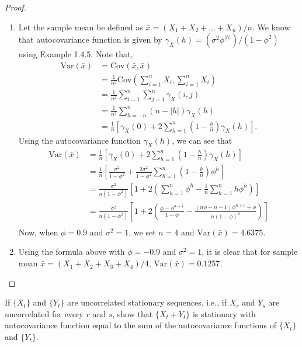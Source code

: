 \documentclass[12pt]{article}
\theoremstyle{definition}
\newenvironment{custompbm}[1]
  {\renewcommand\theproblem{#1}\problem}
  {\endproblem}
\newcommand{\V}{\text{Var}}
\newcommand{\Co}[2]{\text{Cov}({#1}, {#2})}
\begin{document}
\begin{proof}
  \begin{enumerate}
    \item Let the sample mean be defined as $\bar{x} = (X_1 + X_2 + \dots + X_n) / n$.
      We know that autocovariance function is given by
      $\gamma_X(h) = (\sigma^2\phi ^ {|h|} ) / (1 - \phi^2)$ using Example 1.4.5.
      Note that,
      \begin{align*}
        \V(\bar{x}) &= \Co{\bar{x}}{\bar{x}} \\
        &= \frac{1}{n^2}\text{Cov}\left(\sum_{i=1}^n X_i, \sum_{i=1}^n X_i\right) \\
        &= \frac{1}{n^2}\sum_{i=1}^{n} \sum_{j=1}^n \gamma_X(i,j) \\
        &= \frac{1}{n^2}\sum_{h=-n}^{n} (n - |h|)\gamma_X(h)\\
        &= \frac{1}{n}\left[\gamma_X(0) + 2\sum_{h=1}^{n}\left(1-\frac{h}{n}\right)\gamma_X(h)\right].
      \end{align*}
      Using the autocovariance function $\gamma_X(h)$, we can see that
      \begin{align*}
        \V(\bar{x}) &= \frac{1}{n}\left[\gamma_X(0) + 2\sum_{h=1}^{n}\left(1-\frac{h}{n}\right)\gamma_X(h)\right] \\
        &= \frac{1}{n}\left[\frac{\sigma^2}{1-\phi^2} + \frac{2\sigma^2}{1-\phi^2}\sum_{h=1}^n \left(1-\frac{h}{n}\right)\phi^h \right] \\
        &= \frac{\sigma^2}{n(1-\phi^2)}\left[1 + 2\left(\sum_{h=1}^n \phi^h- \frac{1}{n}\sum_{h=1}^n h\phi^h \right)\right] \\
        &= \frac{\sigma^2}{n(1-\phi^2)}\left[1 + 2\left(\frac{\phi-\phi^{n+1}}{1-\phi}- \frac{(n\phi - n - 1)\phi^{n+1} + \phi}{n(1-\phi)^2}\right)\right] \\
      \end{align*}
      Now, when $\phi = 0.9$ and $\sigma^2 = 1$, we set $n=4$ and $\V(\bar{x}) = 4.6375$.
    \item Using the formula above with $\phi = -0.9$ and $\sigma^2 = 1$, it is
      clear that for sample mean $\bar{x} = (X_1 + X_2 + X_3 + X_4) / 4$, $\V(\bar{x}) = 0.1257$.
  \end{enumerate}
\end{proof}


\begin{custompbm}{1.7}
  If $\{ X_t \}$ and $\{ Y_t \}$ are uncorrelated stationary sequences, i.e.,
  if $X_r$ and $Y_s$ are uncorrelated for every $r$ and $s$, show that
  $\{ X_t + Y_t \}$ is stationary with autocovariance function equal to the sum
  of the autocovariance functions of $\{ X_t \}$ and $\{ Y_t \}$.
\end{custompbm}
\end{document}
